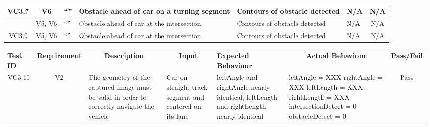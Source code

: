 \documentclass [10pt]{article}
\begin{document}
\begin{longtable}{ | p{ } | p{ } |  p{ } |  p{ } | p{ } | p{ } |  p{ } |}
    
    \multicolumn{1}{|c|}{VC3.7} 
    & \multicolumn{1}{c|}{V6}
    & ``''
    & Obstacle ahead of car on a turning segment
    & Contours of obstacle detected
    & N/A
    & \multicolumn{1}{c|}{N/A}\\ \hline
    
    
   \rowcolor{tableCell} \multicolumn{1}{|c|}{VC3.8} 
    & \multicolumn{1}{c|}{V5, V6}
    & ``''
    & Obstacle ahead of car at the intersection
    & Contours of obstacle detected
    & N/A
    & \multicolumn{1}{c|}{N/A}\\ \hline 
    
    
    \multicolumn{1}{|c|}{VC3.9} 
    & \multicolumn{1}{c|}{V5, V6}
    & ``''
    & Obstacle ahead of car at the intersection
    & Contours of obstacle detected
    & N/A
    & \multicolumn{1}{c|}{N/A}\\ \hline
    
    \end{longtable}
    \newpage
    
  \begin{longtable}{ | p{ } | p{ } |  p{ } |  p{ } | p{ } | p{ } |  p{ } |}  \hline

    \rowcolor{subsectionC}\textbf{Test ID} 
    & \multicolumn{1}{c|}{\textbf{Requirement} }
    & \multicolumn{1}{c|}{\textbf{Description} }
    & \multicolumn{1}{c|}{\textbf{Input} }
    & \textbf{Expected Behaviour} 
    & \multicolumn{1}{c|}{\textbf{Actual Behaviour} }
    & \textbf{Pass/Fail} \\  

    
    \multicolumn{1}{|c|}{VC3.10} 
    & \multicolumn{1}{c|}{V2}
    & The geometry of the captured image must be valid in order to correctly navigate the vehicle
    & Car on straight track segment and centered on its lane
    & leftAngle and rightAngle nearly identical, \newline
      leftLength and rightLength nearly identical 
    & leftAngle = XXX \newline
      rightAngle = XXX \newline
      leftLength = XXX \newline
      rightLength = XXX \newline
      intersectionDetect = 0 \newline
      obstacleDetect = 0 
    & \multicolumn{1}{c|}{Pass}\\ \hline
     
    \end{longtable}
    
\end{document}
